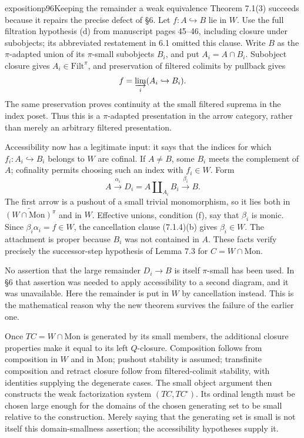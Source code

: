 \begin{dcomment}{exposition}{p96}{Keeping the remainder a weak equivalence}
Theorem 7.1(3) succeeds because it repairs the precise defect of \S6. Let $f:A\hookrightarrow B$ lie in $W$. Use the full filtration hypothesis (d) from manuscript pages 45--46, including closure under subobjects; its abbreviated restatement in 6.1 omitted this clause. Write $B$ as the $\pi$-adapted union of its $\pi$-small subobjects $B_i$, and put $A_i=A\cap B_i$. Subobject closure gives $A_i\in\mathrm{Filt}^{\pi}$, and preservation of filtered colimits by pullback gives
\[
 f=\varinjlim_i(A_i\hookrightarrow B_i).
\]
The same preservation proves continuity at the small filtered suprema in the index poset. Thus this is a $\pi$-adapted presentation in the arrow category, rather than merely an arbitrary filtered presentation.

Accessibility now has a legitimate input: it says that the indices for which $f_i:A_i\hookrightarrow B_i$ belongs to $W$ are cofinal. If $A\neq B$, some $B_i$ meets the complement of $A$; cofinality permits choosing such an index with $f_i\in W$. Form
\[
 A\xrightarrow{\alpha_i}D_i=A\amalg_{A_i}B_i
   \xrightarrow{\beta_i}B.
\]
The first arrow is a pushout of a small trivial monomorphism, so it lies both in $\widetilde{(W\cap\mathrm{Mon})^{\pi}}$ and in $W$. Effective unions, condition (f), say that $\beta_i$ is monic. Since $\beta_i\alpha_i=f\in W$, the cancellation clause (7.1.4)(b) gives $\beta_i\in W$. The attachment is proper because $B_i$ was not contained in $A$. These facts verify precisely the successor-step hypothesis of Lemma 7.3 for $C=W\cap\mathrm{Mon}$.

No assertion that the large remainder $D_i\to B$ is itself $\pi$-small has been used. In \S6 that assertion was needed to apply accessibility to a second diagram, and it was unavailable. Here the remainder is put in $W$ by cancellation instead. This is the mathematical reason why the new theorem survives the failure of the earlier one.

Once $TC=W\cap\mathrm{Mon}$ is generated by its small members, the additional closure properties make it equal to its left $Q$-closure. Composition follows from composition in $W$ and in $\mathrm{Mon}$; pushout stability is assumed; transfinite composition and retract closure follow from filtered-colimit stability, with identities supplying the degenerate cases. The small object argument then constructs the weak factorization system $(TC,TC^{\square})$. Its ordinal length must be chosen large enough for the domains of the chosen generating set to be small relative to the construction. Merely saying that the generating set is small is not itself this domain-smallness assertion; the accessibility hypotheses supply it.
\end{dcomment}


